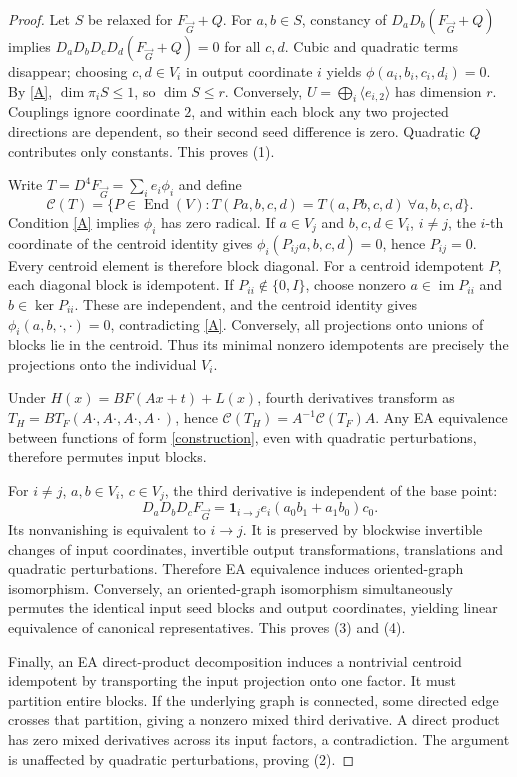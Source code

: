 \documentclass[11pt]{article}
\begin{document}
\begin{proof}
Let $S$ be relaxed for $F_{\vec G}+Q$. For $a,b\in S$, constancy of $D_aD_b(F_{\vec G}+Q)$ implies $D_aD_bD_cD_d(F_{\vec G}+Q)=0$ for all $c,d$. Cubic and quadratic terms disappear; choosing $c,d\in V_i$ in output coordinate $i$ yields $\phi(a_i,b_i,c_i,d_i)=0$. By \eqref{A}, $\dim\pi_i S\le1$, so $\dim S\le r$. Conversely, $U=\bigoplus_i\langle e_{i,2}\rangle$ has dimension $r$. Couplings ignore coordinate $2$, and within each block any two projected directions are dependent, so their second seed difference is zero. Quadratic $Q$ contributes only constants. This proves (1).

Write $T=D^4F_{\vec G}=\sum_i e_i\phi_i$ and define
\[
\mathcal C(T)=\{P\in\operatorname{End}(V):T(Pa,b,c,d)=T(a,Pb,c,d)\ \forall a,b,c,d\}.
\]
Condition \eqref{A} implies $\phi_i$ has zero radical. If $a\in V_j$ and $b,c,d\in V_i$, $i\ne j$, the $i$-th coordinate of the centroid identity gives $\phi_i(P_{ij}a,b,c,d)=0$, hence $P_{ij}=0$. Every centroid element is therefore block diagonal. For a centroid idempotent $P$, each diagonal block is idempotent. If $P_{ii}\notin\{0,I\}$, choose nonzero $a\in\operatorname{im}P_{ii}$ and $b\in\ker P_{ii}$. These are independent, and the centroid identity gives $\phi_i(a,b,\cdot,\cdot)=0$, contradicting \eqref{A}. Conversely, all projections onto unions of blocks lie in the centroid. Thus its minimal nonzero idempotents are precisely the projections onto the individual $V_i$.

Under $H(x)=B F(Ax+t)+L(x)$, fourth derivatives transform as $T_H=B T_F(A\cdot,A\cdot,A\cdot,A\cdot)$, hence $\mathcal C(T_H)=A^{-1}\mathcal C(T_F)A$. Any EA equivalence between functions of form \eqref{construction}, even with quadratic perturbations, therefore permutes input blocks.

For $i\ne j$, $a,b\in V_i$, $c\in V_j$, the third derivative is independent of the base point:
\[
D_aD_bD_cF_{\vec G}
=\mathbf1_{i\to j}e_i(a_0b_1+a_1b_0)c_0.
\]
Its nonvanishing is equivalent to $i\to j$. It is preserved by blockwise invertible changes of input coordinates, invertible output transformations, translations and quadratic perturbations. Therefore EA equivalence induces oriented-graph isomorphism. Conversely, an oriented-graph isomorphism simultaneously permutes the identical input seed blocks and output coordinates, yielding linear equivalence of canonical representatives. This proves (3) and (4).

Finally, an EA direct-product decomposition induces a nontrivial centroid idempotent by transporting the input projection onto one factor. It must partition entire blocks. If the underlying graph is connected, some directed edge crosses that partition, giving a nonzero mixed third derivative. A direct product has zero mixed derivatives across its input factors, a contradiction. The argument is unaffected by quadratic perturbations, proving (2).
\end{proof}
\end{document}
